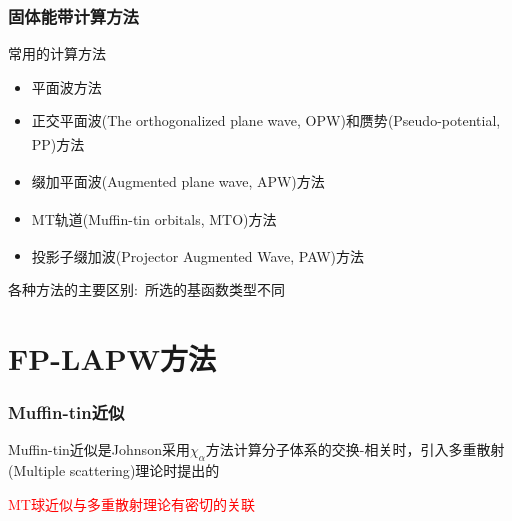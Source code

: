 \documentclass[cjk,slidestop,compress,mathserif,blue]{beamer}
\newcommand{\upcite}[1]{\hspace{0ex}\textsuperscript{\cite{#1}}} %
\begin{document}
\frame
{
\frametitle{固体能带计算方法}
\vskip 10pt
常用的计算方法
\begin{itemize}%
\setlength{\itemsep}{15pt}
	\item	平面波方法
	\item	正交平面波\textrm{(The orthogonalized plane wave, OPW)}和赝势\textrm{(Pseudo-potential, PP)}方法\upcite{Singh,PRB41-7892_1990,JPCM6-8245_1994}
	\item	缀加平面波\textrm{(Augmented plane wave, APW)}方法\upcite{Singh}
	\item	\textrm{MT}轨道\textrm{(Muffin-tin orbitals, MTO)}方法\upcite{Skriver}
	\item	投影子缀加波\textrm{(Projector Augmented Wave, PAW)}方法\upcite{PRB50-17953_1994,PRB59-1758_1999}
\end{itemize}
  \vskip 5pt 各种方法的主要区别:~所选的基函数类型不同
}

\section{FP-LAPW方法}
\frame
{
	\frametitle{\textrm{Muffin-tin}近似}
\begin{figure}[h!]
\centering
{}
\label{Muffin_tin-1}
\end{figure}
\textrm{Muffin-tin}近似是\textrm{Johnson}采用$\chi_{\alpha}$方法计算分子体系的交换-相关时，引入多重散射(\textrm{Multiple scattering})理论时提出的%

\textcolor{red}{\textrm{MT}球近似与多重散射理论有密切的关联}
}
\end{document}
